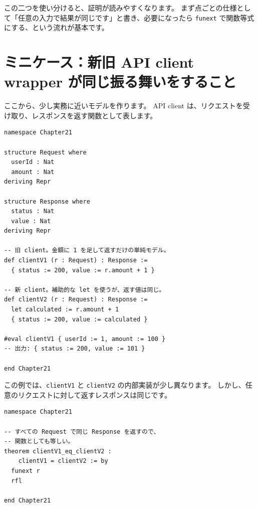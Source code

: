 この二つを使い分けると、証明が読みやすくなります。
まず点ごとの仕様として「任意の入力で結果が同じです」と書き、必要になったら \texttt{funext} で関数等式にする、という流れが基本です。

\section{ミニケース：新旧 API client wrapper が同じ振る舞いをすること}

ここから、少し実務に近いモデルを作ります。
API client は、リクエストを受け取り、レスポンスを返す関数として表します。

\begin{listing}[htbp]
\begin{verbatim}
namespace Chapter21

structure Request where
  userId : Nat
  amount : Nat
deriving Repr

structure Response where
  status : Nat
  value : Nat
deriving Repr

-- 旧 client。金額に 1 を足して返すだけの単純モデル。
def clientV1 (r : Request) : Response :=
  { status := 200, value := r.amount + 1 }

-- 新 client。補助的な let を使うが、返す値は同じ。
def clientV2 (r : Request) : Response :=
  let calculated := r.amount + 1
  { status := 200, value := calculated }

#eval clientV1 { userId := 1, amount := 100 }
-- 出力: { status := 200, value := 101 }

end Chapter21
\end{verbatim}
\caption{\texttt{clientV1} と \texttt{clientV2}}
\label{lst:ch21-api-model}
\end{listing}

この例では、\texttt{clientV1} と \texttt{clientV2} の内部実装が少し異なります。
しかし、任意のリクエストに対して返すレスポンスは同じです。

\begin{listing}[htbp]
\begin{verbatim}
namespace Chapter21

-- すべての Request で同じ Response を返すので、
-- 関数としても等しい。
theorem clientV1_eq_clientV2 :
    clientV1 = clientV2 := by
  funext r
  rfl

end Chapter21
\end{verbatim}
\caption{\texttt{clientV1\_eq\_clientV2}}
\label{lst:ch21-api-client-eq}
\end{listing}

